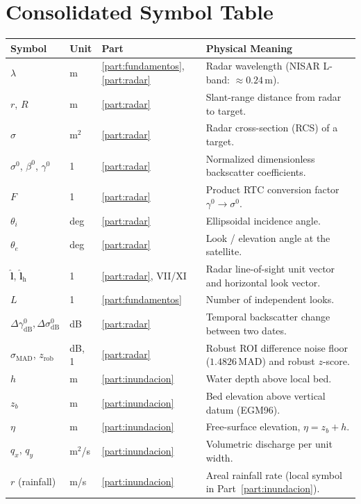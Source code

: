 \documentclass[11pt,a4paper]{article}
\begin{document}
\section{Consolidated Symbol Table}
\label{sec:simbolos-global}

\begin{longtable}{p{.16\linewidth}p{.11\linewidth}p{.16\linewidth}p{.45\linewidth}}
\toprule Symbol & Unit & Part & Physical Meaning\\\midrule\endhead
$\lambda$ & m & \ref{part:fundamentos}, \ref{part:radar} & Radar wavelength (NISAR L-band: $\approx0.24$\,m).\\
$r$, $R$ & m & \ref{part:radar} & Slant-range distance from radar to target.\\
$\sigma$ & m$^2$ & \ref{part:radar} & Radar cross-section (RCS) of a target.\\
$\sigma^0$, $\beta^0$, $\gamma^0$ & 1 & \ref{part:radar} & Normalized dimensionless backscatter coefficients.\\
$F$ & 1 & \ref{part:radar} & Product RTC conversion factor $\gamma^0\to\sigma^0$.\\
$\theta_i$ & deg & \ref{part:radar} & Ellipsoidal incidence angle.\\
$\theta_e$ & deg & \ref{part:radar} & Look / elevation angle at the satellite.\\
$\hat{\mathbf{l}}$, $\hat{\mathbf{l}}_{\mathrm{h}}$ & 1 & \ref{part:radar}, VII/XI & Radar line-of-sight unit vector and horizontal look vector.\\
$L$ & 1 & \ref{part:fundamentos} & Number of independent looks.\\
$\Delta\gamma^0_{\mathrm{dB}}, \Delta\sigma^0_{\mathrm{dB}}$ & dB & \ref{part:radar} & Temporal backscatter change between two dates.\\
$\sigma_{\mathrm{MAD}}$, $z_{\mathrm{rob}}$ & dB, 1 & \ref{part:radar} & Robust ROI difference noise floor ($1.4826\,\mathrm{MAD}$) and robust $z$-score.\\
$h$ & m & \ref{part:inundacion} & Water depth above local bed.\\
$z_b$ & m & \ref{part:inundacion} & Bed elevation above vertical datum (EGM96).\\
$\eta$ & m & \ref{part:inundacion} & Free-surface elevation, $\eta=z_b+h$.\\
$q_x$, $q_y$ & m$^2$/s & \ref{part:inundacion} & Volumetric discharge per unit width.\\
$r$ (rainfall) & m/s & \ref{part:inundacion} & Areal rainfall rate (local symbol in Part~\ref{part:inundacion}).\\

\end{longtable}
\end{document}
